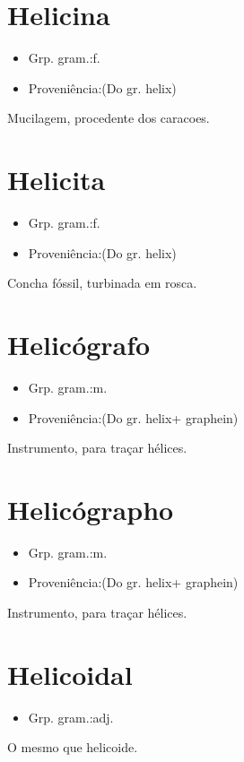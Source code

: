 \documentclass{article}
\begin{document}
\section{Helicina}
\begin{itemize}
\item {Grp. gram.:f.}
\end{itemize}
\begin{itemize}
\item {Proveniência:(Do gr. \textunderscore helix\textunderscore )}
\end{itemize}
Mucilagem, procedente dos caracoes.
\section{Helicita}
\begin{itemize}
\item {Grp. gram.:f.}
\end{itemize}
\begin{itemize}
\item {Proveniência:(Do gr. \textunderscore helix\textunderscore )}
\end{itemize}
Concha fóssil, turbinada em rosca.
\section{Helicógrafo}
\begin{itemize}
\item {Grp. gram.:m.}
\end{itemize}
\begin{itemize}
\item {Proveniência:(Do gr. \textunderscore helix\textunderscore  + \textunderscore graphein\textunderscore )}
\end{itemize}
Instrumento, para traçar hélices.
\section{Helicógrapho}
\begin{itemize}
\item {Grp. gram.:m.}
\end{itemize}
\begin{itemize}
\item {Proveniência:(Do gr. \textunderscore helix\textunderscore  + \textunderscore graphein\textunderscore )}
\end{itemize}
Instrumento, para traçar hélices.
\section{Helicoidal}
\begin{itemize}
\item {Grp. gram.:adj.}
\end{itemize}
O mesmo que \textunderscore helicoide\textunderscore .
\end{document}
